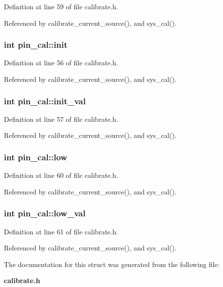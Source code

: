 Definition at line 59 of file calibrate.h.

Referenced by calibrate\_\-current\_\-source(), and sys\_\-cal().
\subsubsection{\setlength{\rightskip}{0pt plus 5cm}int {\bf pin\_\-cal::init}}\label{structpin__cal_o0}




Definition at line 56 of file calibrate.h.

Referenced by calibrate\_\-current\_\-source(), and sys\_\-cal().
\subsubsection{\setlength{\rightskip}{0pt plus 5cm}int {\bf pin\_\-cal::init\_\-val}}\label{structpin__cal_o1}




Definition at line 57 of file calibrate.h.

Referenced by calibrate\_\-current\_\-source(), and sys\_\-cal().
\subsubsection{\setlength{\rightskip}{0pt plus 5cm}int {\bf pin\_\-cal::low}}\label{structpin__cal_o4}




Definition at line 60 of file calibrate.h.

Referenced by calibrate\_\-current\_\-source(), and sys\_\-cal().
\subsubsection{\setlength{\rightskip}{0pt plus 5cm}int {\bf pin\_\-cal::low\_\-val}}\label{structpin__cal_o5}




Definition at line 61 of file calibrate.h.

Referenced by calibrate\_\-current\_\-source(), and sys\_\-cal().

The documentation for this struct was generated from the following file:\begin{CompactItemize}
\item 
{\bf calibrate.h}\end{CompactItemize}
